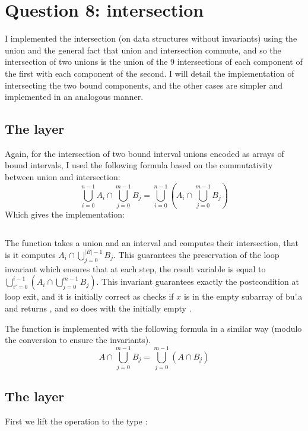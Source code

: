 \section{Question 8: intersection}

I implemented the intersection (on data structures without invariants)
using the union and the general fact that union and intersection commute, and so the
intersection of two unions is the union of the 9 intersections of each component of
the first with each component of the second.
%
I will detail the implementation of intersecting the two bound components, and the
other cases are simpler and implemented in an analogous manner.

\subsection{The  layer}

Again, for the intersection of two bound interval unions encoded as arrays of bound
intervals, I used the following formula based on the commutativity between union
and intersection:
%
$$
\bigcup_{i=0}^{n-1}{A_i} \cap \bigcup_{j=0}^{m-1}{B_j}
=
\bigcup_{i=0}^{n-1}{\left( A_i \cap \bigcup_{j=0}^{m-1}{B_j}\right)}
$$
%
Which gives the implementation: \inputminted{\whyml}{why3code/inter_union.mlw} The
function  takes a union and an interval and computes their
intersection, that is it computes $A_i \cap \bigcup_{j=0}^{|B|-1}{B_j}$. This
guarantees the preservation of the loop invariant which ensures that at each step, the
result variable is equal to
%
$\bigcup_{i'=0}^{i-1}{\left( A_i \cap \bigcup_{j=0}^{m-1}{B_j}\right)}$.
%
This invariant guarantees exactly the postcondition at loop exit, and it is initially
correct as  checks if $x$ is in the empty
subarray of bu'.a and returns , and so does  with the initially empty .

The  function is implemented with the following formula in a
similar way (modulo the conversion to ensure the  invariants).
$$
A \cap \bigcup_{j=0}^{m-1}{B_j}
=
{\bigcup_{j=0}^{m-1}{\left(A \cap B_j\right)}}
$$

\subsection{The  layer}

First we lift the operation  to the type :
\inputminted{\whyml}{why3code/inter_bound_bound.mlw}

